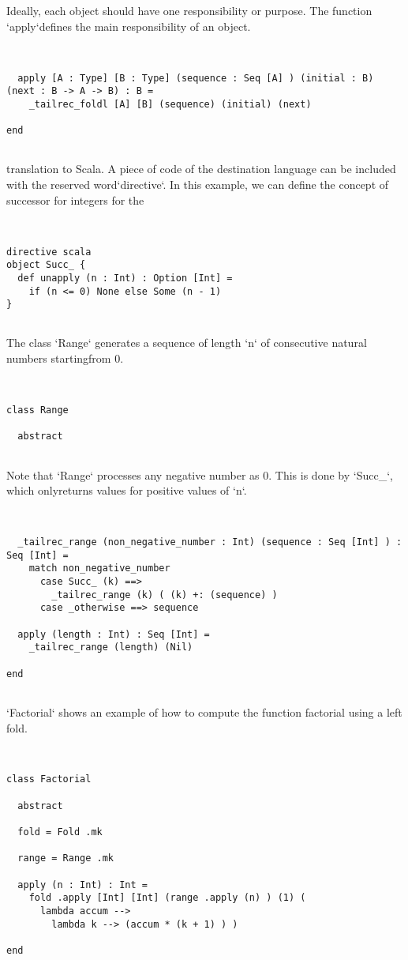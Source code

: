 \documentclass[12pt,a4paper]{article}
\begin{document}
Ideally, each object should have one responsibility or purpose. The function `apply`defines the main responsibility of an object. 


\begin{lstlisting}


  apply [A : Type] [B : Type] (sequence : Seq [A] ) (initial : B) (next : B -> A -> B) : B =
    _tailrec_foldl [A] [B] (sequence) (initial) (next)

end


\end{lstlisting}

translation to Scala. A piece of code of the destination language can be included with the reserved word`directive`. In this example, we can define the concept of successor for integers for the


\begin{lstlisting}


directive scala
object Succ_ {
  def unapply (n : Int) : Option [Int] =
    if (n <= 0) None else Some (n - 1)
}


\end{lstlisting}

The class `Range` generates a sequence of length `n` of consecutive natural numbers startingfrom 0. 


\begin{lstlisting}


class Range

  abstract


\end{lstlisting}

Note that `Range` processes any negative number as 0. This is done by `Succ_`, which onlyreturns values for positive values of `n`. 


\begin{lstlisting}


  _tailrec_range (non_negative_number : Int) (sequence : Seq [Int] ) : Seq [Int] =
    match non_negative_number
      case Succ_ (k) ==>
        _tailrec_range (k) ( (k) +: (sequence) )
      case _otherwise ==> sequence

  apply (length : Int) : Seq [Int] =
    _tailrec_range (length) (Nil)

end


\end{lstlisting}

`Factorial` shows an example of how to compute the function factorial using a left fold. 


\begin{lstlisting}


class Factorial

  abstract

  fold = Fold .mk

  range = Range .mk

  apply (n : Int) : Int =
    fold .apply [Int] [Int] (range .apply (n) ) (1) (
      lambda accum -->
        lambda k --> (accum * (k + 1) ) )

end


\end{lstlisting}
\end{document}
